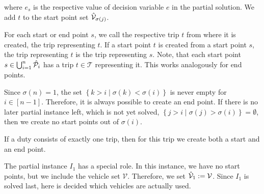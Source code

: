 where $e_s$ is the respective value of decision variable $e$ in the partial solution. We add $t$ to the start point set $\hat{\mathcal{V}}_{\sigma(j)}$.

For each start or end point $s$, we call the respective trip $t$ from where it is created, the trip representing $t$. If a start point $t$ is created from a start point $s$, the trip representing $t$ is the trip representing $s$. Note, that each start point ${s\in\bigcup_{i=1}^n\hat{\mathcal{P}}_i}$ has a trip ${t\in\mathcal{T}}$ representing it. This works analogously for end points.

\begin{remark}

Since $\sigma(n)=1$, the set ${\left\{k>i\mid\sigma(k)<\sigma(i)\right\}}$ is never empty for $i\in[n-1]$. Therefore, it is always possible to create an end point. If there is no later partial instance left, which is not yet solved, \ie ${\left\{j>i\mid\sigma(j)>\sigma(i)\right\}=\emptyset}$, then we create no start points out of $\sigma(i)$.

If a duty consists of exactly one trip, then for this trip we create both a start and an end point.

\end{remark}

The partial instance $I_1$ has a special role. In this instance, we have no start points, but we include the vehicle set $\mathcal{V}$. Therefore, we set ${\hat{\mathcal{V}}_1:=\mathcal{V}}$. Since $I_1$ is solved last, here is decided which vehicles are actually used. 

